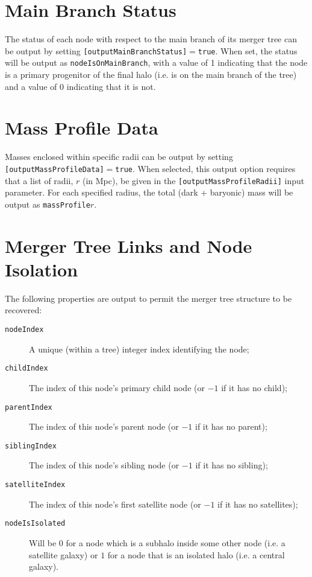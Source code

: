\section{Main Branch Status}

The status of each node with respect to the main branch of its merger tree can be output by setting {\tt [outputMainBranchStatus]}$=${\tt true}. When set, the status will be output as {\tt nodeIsOnMainBranch}, with a value of 1 indicating that the node is a primary progenitor of the final halo (i.e. is on the main branch of the tree) and a value of 0 indicating that it is not.

\section{Mass Profile Data}

Masses enclosed within specific radii can be output by setting {\tt [outputMassProfileData]}$=${\tt true}. When selected, this output option requires that a list of radii, $r$ (in Mpc), be given in the {\tt [outputMassProfileRadii]} input parameter. For each specified radius, the total (dark + baryonic) mass will be output as {\tt massProfile}$r$.

\section{Merger Tree Links and Node Isolation}

The following properties are output to permit the merger tree structure to be recovered:
\begin{description}
 \item [{\tt nodeIndex}] A unique (within a tree) integer index identifying the node;
 \item [{\tt childIndex}] The index of this node's primary child node (or $-1$ if it has no child);
 \item [{\tt parentIndex}] The index of this node's parent node (or $-1$ if it has no parent);
 \item [{\tt siblingIndex}] The index of this node's sibling node (or $-1$ if it has no sibling);
 \item [{\tt satelliteIndex}] The index of this node's first satellite node (or $-1$ if it has no satellites);
 \item [{\tt nodeIsIsolated}] Will be $0$ for a node which is a subhalo inside some other node (i.e. a satellite galaxy) or $1$ for a node that is an isolated halo (i.e. a central galaxy).
\end{description}

